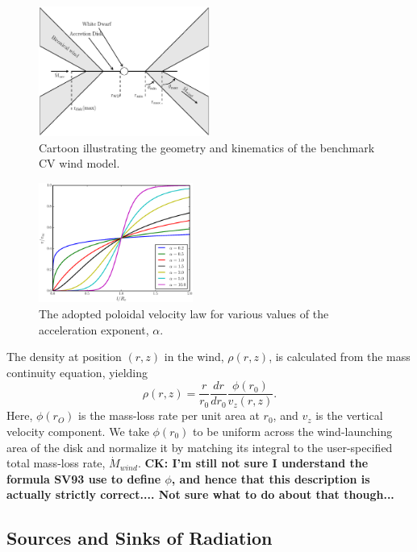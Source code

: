 \documentclass[preprint, a4paper, 11pt]{aastex}
\begin{document}
\begin{figure}
\centering
\includegraphics[width=0.5\textwidth]{figures/fig2_cartoon.eps}
\caption{Cartoon illustrating the geometry and kinematics of the benchmark CV wind model.}
\label{cartoon}
\end{figure}

\begin{figure}
\centering
\includegraphics[width=0.45\textwidth]{figures/acc_law.eps}
\caption{
The adopted poloidal velocity law for various values of the
acceleration exponent, $\alpha$.} 
\label{acc_law}
\end{figure}

The density at position $(r,z)$ in the wind, $\rho(r,z)$, is
calculated from the mass continuity equation, yielding
\begin{equation}
\rho(r,z) = \frac{r}{r_0} \frac{dr}{dr_0} \frac{\phi(r_0)}{v_z(r,z)}.
\label{density}
\end{equation}
Here, $\phi(r_O)$ is the mass-loss rate per unit area at $r_0$, 
and $v_z$ is the vertical velocity component. We take $\phi(r_0)$ to be
uniform across the wind-launching area of the disk and normalize it by
matching its integral to the user-specified total mass-loss rate,
$\dot{M}_{wind}$. 
{\bf CK: I'm still not sure I understand the formula
  SV93 use to define $\phi$, and hence that this description is
  actually strictly correct.... Not sure what to do about that
  though...}

\subsection{Sources and Sinks of Radiation}
\label{radsources}
\end{document}
